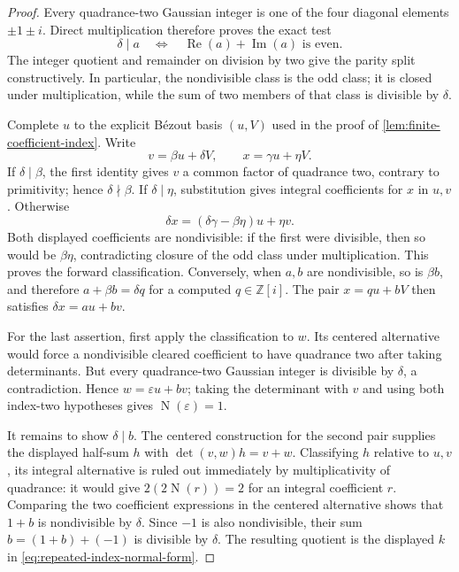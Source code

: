 \documentclass[11pt]{article}
\newcommand{\Zi}{\mathbb{Z}[i]}
\newcommand{\Norm}[1]{\operatorname{N}\!\left(#1\right)}
\newcommand{\Ree}{\operatorname{Re}}
\newcommand{\Imm}{\operatorname{Im}}
\begin{document}
\begin{proof}
Every quadrance-two Gaussian integer is one of the four diagonal elements
$\pm1\pm i$.  Direct multiplication therefore proves the exact test
\begin{equation}
\label{eq:diagonal-divisibility-parity}
 \delta\mid a
 \quad\Longleftrightarrow\quad
 \Ree(a)+\Imm(a)\text{ is even}.
\end{equation}
The integer quotient and remainder on division by two give the parity split
constructively.  In particular, the nondivisible class is the odd class; it
is closed under multiplication, while the sum of two members of that class
is divisible by $\delta$.

Complete $u$ to the explicit B\'ezout basis $(u,V)$ used in the proof of
\cref{lem:finite-coefficient-index}.  Write
\[
       v=\beta u+\delta V,
       \qquad x=\gamma u+\eta V.
\]
If $\delta\mid\beta$, the first identity gives $v$ a common factor of
quadrance two, contrary to primitivity; hence $\delta\nmid\beta$.  If
$\delta\mid\eta$, substitution gives integral coefficients for $x$ in
$u,v$.  Otherwise
\[
 \delta x=(\delta\gamma-\beta\eta)u+\eta v.
\]
Both displayed coefficients are nondivisible: if the first were divisible,
then so would be $\beta\eta$, contradicting closure of the odd class under
multiplication.  This proves the forward classification.  Conversely, when
$a,b$ are nondivisible, so is $\beta b$, and therefore
$a+\beta b=\delta q$ for a computed $q\in\Zi$.  The pair
$x=q u+bV$ then satisfies $\delta x=a u+bv$.

For the last assertion, first apply the classification to $w$.  Its centered
alternative would force a nondivisible cleared coefficient to have
quadrance two after taking determinants.  But every quadrance-two Gaussian
integer is divisible by $\delta$, a contradiction.  Hence
$w=\varepsilon u+bv$; taking the determinant with $v$ and using both
index-two hypotheses gives $\Norm\varepsilon=1$.

It remains to show $\delta\mid b$.  The centered construction for the second
pair supplies the displayed half-sum $h$ with
$\det(v,w)h=v+w$.  Classifying $h$ relative to $u,v$, its integral
alternative is ruled out immediately by multiplicativity of quadrance: it
would give $2(2\Norm r)=2$ for an integral coefficient $r$.  Comparing the
two coefficient expressions in the centered alternative shows that
$1+b$ is nondivisible by $\delta$.  Since $-1$ is also nondivisible, their
sum $b=(1+b)+(-1)$ is divisible by $\delta$.  The resulting quotient is the
displayed $k$ in \eqref{eq:repeated-index-normal-form}.


\end{proof}
\end{document}
